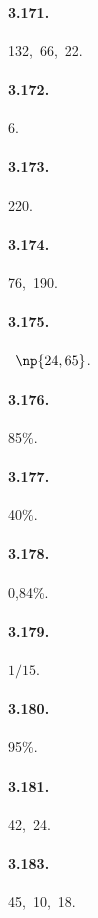 \begin{multicols}{2}
\paragraph{3.171.} 132,~66,~22.

\paragraph{3.172.} 6.

\paragraph{3.173.} 220.

\paragraph{3.174.} 76,~190.

\paragraph{3.175.} \officialeuro~$\np{24,65}$.

\paragraph{3.176.} 85\%.

\paragraph{3.177.} 40\%.

\paragraph{3.178.} 0,84\%.

\paragraph{3.179.} $ 1/15 $.

\paragraph{3.180.} 95\%.

\paragraph{3.181.} 42,~24.

\paragraph{3.183.} 45,~10,~18.


\end{multicols}
